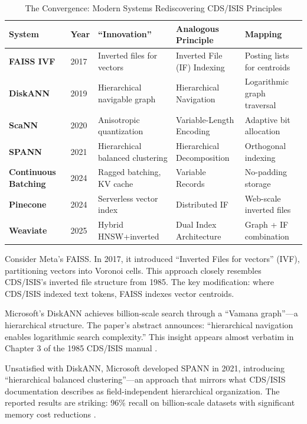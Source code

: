 \documentclass[manuscript,screen,nonacm]{acmart}
\begin{document}
\begin{table}[h]
\centering
\caption{The Convergence: Modern Systems Rediscovering CDS/ISIS Principles}
\label{tab:convergence}
\begin{tabular}{p{} p{} p{} p{} p{}}
\toprule
\textbf{System} & \textbf{Year} & \textbf{``Innovation''} & \textbf{Analogous Principle} & \textbf{Mapping} \\
\midrule
\textbf{FAISS IVF} \cite{johnson2017} & 2017 & Inverted files for vectors & Inverted File (IF) Indexing & Posting lists for centroids \\
\textbf{DiskANN} \cite{subramanya2019} & 2019 & Hierarchical navigable graph & Hierarchical Navigation & Logarithmic graph traversal \\
\textbf{ScaNN} \cite{guo2020} & 2020 & Anisotropic quantization & Variable-Length Encoding & Adaptive bit allocation \\
\textbf{SPANN} \cite{chen2021} & 2021 & Hierarchical balanced clustering & Hierarchical Decomposition & Orthogonal indexing \\
\textbf{Continuous Batching} \cite{reboul2025} & 2024 & Ragged batching, KV cache & Variable Records & No-padding storage \\
\textbf{Pinecone} \cite{pinecone2024} & 2024 & Serverless vector index & Distributed IF & Web-scale inverted files \\
\textbf{Weaviate} \cite{weaviate2025} & 2025 & Hybrid HNSW+inverted & Dual Index Architecture & Graph + IF combination \\
\bottomrule
\end{tabular}
\end{table}

Consider Meta's FAISS. In 2017, it introduced ``Inverted Files for vectors'' (IVF), partitioning vectors into Voronoi cells. This approach closely resembles CDS/ISIS's inverted file structure from 1985. The key modification: where CDS/ISIS indexed text tokens, FAISS indexes vector centroids.

Microsoft's DiskANN achieves billion-scale search through a ``Vamana graph''---a hierarchical structure. The paper's abstract announces: ``hierarchical navigation enables logarithmic search complexity.'' This insight appears almost verbatim in Chapter 3 of the 1985 CDS/ISIS manual \cite{unesco1989}.

Unsatisfied with DiskANN, Microsoft developed SPANN in 2021, introducing ``hierarchical balanced clustering''---an approach that mirrors what CDS/ISIS documentation describes as field-independent hierarchical organization. The reported results are striking: 96\% recall on billion-scale datasets with significant memory cost reductions \cite{chen2021}.
\end{document}
